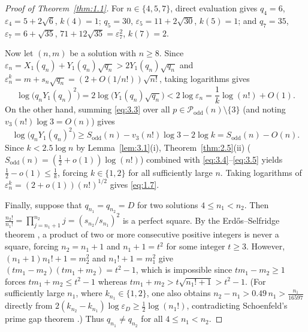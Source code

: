 \documentclass[11pt,reqno]{amsart}
\theoremstyle{remark}
\numberwithin{equation}{section}
\newcommand{\Podd}{\mathcal{P}_{\mathrm{odd}}}
\newcommand{\Sodd}{S_{\mathrm{odd}}}
\begin{document}
\begin{proof}[Proof of Theorem~\ref{thm:1.1}]
For $n \in \{4, 5, 7\}$, direct evaluation gives $q_4 = 6$, $\varepsilon_4 = 5 + 2\sqrt{6}$, $k(4) = 1$; $q_5 = 30$, $\varepsilon_5 = 11 + 2\sqrt{30}$, $k(5) = 1$; and $q_7 = 35$, $\varepsilon_7 = 6 + \sqrt{35}$, $71 + 12\sqrt{35} = \varepsilon_7^2$, $k(7) = 2$.

Now let $(n, m)$ be a solution with $n \ge 8$. Since $\varepsilon_n = X_1(q_n) + Y_1(q_n)\sqrt{q_n} > 2Y_1(q_n)\sqrt{q_n}$ and $\varepsilon_n^k = m + s_n\sqrt{q_n} = (2 + O(1/n!))\sqrt{n!}$, taking logarithms gives
\begin{equation}\label{eq:3.4}
\log\bigl(q_n Y_1(q_n)^2\bigr) = 2\log\bigl(Y_1(q_n)\sqrt{q_n}\bigr) < 2\log \varepsilon_n = \frac{1}{k}\log(n!) + O(1).
\end{equation}
On the other hand, summing \eqref{eq:3.3} over all $p \in \Podd(n) \setminus \{3\}$ (and noting $v_3(n!)\log 3 = O(n)$) gives
\begin{equation}\label{eq:3.5}
\log\bigl(q_n Y_1(q_n)^2\bigr) \ge \Sodd(n) - v_3(n!)\log 3 - 2\log k = \Sodd(n) - O(n).
\end{equation}
Since $k < 2.5\log n$ by Lemma~\ref{lem:3.1}(i), Theorem~\ref{thm:2.5}(ii) ($\Sodd(n) = (\frac{1}{2} + o(1))\log(n!)$) combined with \eqref{eq:3.4}--\eqref{eq:3.5} yields $\frac{1}{2} - o(1) \le \frac{1}{k}$, forcing $k \in \{1, 2\}$ for all sufficiently large $n$. Taking logarithms of $\varepsilon_n^k = (2 + o(1))(n!)^{1/2}$ gives \eqref{eq:1.7}.

Finally, suppose that $q_{n_1} = q_{n_2} = D$ for two solutions $4 \le n_1 < n_2$. Then $\frac{n_2!}{n_1!} = \prod_{j=n_1+1}^{n_2} j = (s_{n_2}/s_{n_1})^2$ is a perfect square. By the Erd\H{o}s--Selfridge theorem \cite{ErdosSelfridge1975}, a product of two or more consecutive positive integers is never a square, forcing $n_2 = n_1 + 1$ and $n_1 + 1 = t^2$ for some integer $t \ge 3$. However, $(n_1 + 1)n_1! + 1 = m_2^2$ and $n_1! + 1 = m_1^2$ give $(tm_1 - m_2)(tm_1 + m_2) = t^2 - 1$, which is impossible since $tm_1 - m_2 \ge 1$ forces $tm_1 + m_2 \le t^2 - 1$ whereas $tm_1 + m_2 > t\sqrt{n_1! + 1} > t^2 - 1$. (For sufficiently large $n_1$, where $k_{n_1} \in \{1, 2\}$, one also obtains $n_2 - n_1 > 0.49\,n_1 > \frac{n_1}{16597}$ directly from $2(k_{n_2} - k_{n_1})\log \varepsilon_D \ge \frac{1}{2}\log(n_1!)$, contradicting Schoenfeld's prime gap theorem \cite{Schoenfeld1976}.) Thus $q_{n_1} \ne q_{n_2}$ for all $4 \le n_1 < n_2$.
\end{proof}
\end{document}
